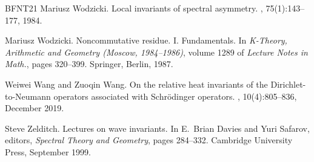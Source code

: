 \documentclass[11pt]{amsart}
\theoremstyle{definition}
\numberwithin{equation}{section}
\begin{document}
\begin{thebibliography}{BFNT21}
    Mariusz Wodzicki.
    \newblock Local invariants of spectral asymmetry.
    , 75(1):143--177, 1984.
    
    Mariusz Wodzicki.
    \newblock Noncommutative residue. {{I}}. {{Fundamentals}}.
    \newblock In {\em K-Theory, Arithmetic and Geometry ({{Moscow}}, 1984--1986)},
      volume 1289 of {\em Lecture {{Notes}} in {{Math}}.}, pages 320--399.
      Springer, Berlin, 1987.
    
    Weiwei Wang and Zuoqin Wang.
    \newblock On the relative heat invariants of the {{Dirichlet-to-Neumann}}
      operators associated with {{Schr{\"o}dinger}} operators.
    , 10(4):805--836, December 2019.
    
    Steve Zelditch.
    \newblock Lectures on wave invariants.
    \newblock In E.~Brian Davies and Yuri Safarov, editors, {\em Spectral
      {{Theory}} and {{Geometry}}}, pages 284--332. Cambridge University Press,
      September 1999.
    
    \end{thebibliography}
    
    
\end{document}
